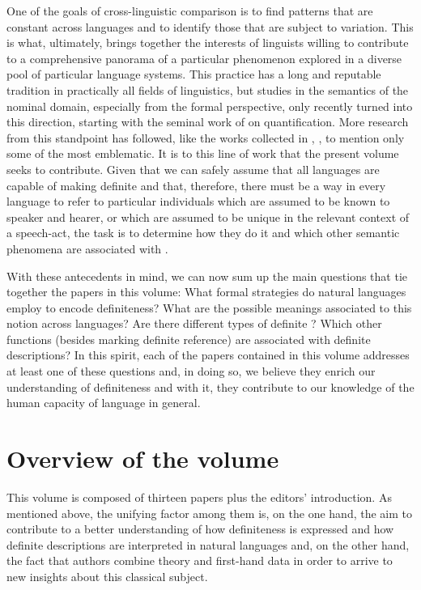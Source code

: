 \documentclass[output=paper]{langsci/langscibook}
\begin{document}
One of the goals of cross-linguistic comparison is to find patterns that are constant across languages and to identify those that are subject to variation. This is what, ultimately, brings together the interests of linguists willing to contribute to a comprehensive panorama of a particular phenomenon explored in a diverse pool of particular language systems. This practice has a long and reputable tradition in practically all fields of linguistics, but studies in the semantics of the nominal domain, especially from the formal perspective, only recently turned into this direction, starting with the seminal work of \citet{Bach1995} on quantification. More research from this standpoint has followed, like the works collected in \citet{Matthewson2008a}, \citet{Keenan2012}, to mention only some of the most emblematic. It is to this line of work that the present volume seeks to contribute. Given that we can safely assume that all languages are capable of making definite  and that, therefore, there must be a way in every language to refer to particular individuals which are assumed to be known to speaker and hearer, or which are assumed to be unique in the relevant context of a speech-act, the task is to determine how they do it and which other semantic phenomena are associated with . \newpage

With these antecedents in mind, we can now sum up the main questions that tie together the papers in this volume: What formal strategies do natural languages employ to encode definiteness? What are the possible meanings associated to this notion across languages? Are there different types of definite ? Which other functions (besides marking definite reference) are associated with definite descriptions? In this spirit, each of the papers contained in this volume addresses at least one of these questions and, in doing so, we believe they enrich our understanding of definiteness and with it, they contribute to our knowledge of the human capacity of language in general. 

\section{Overview of the volume}

This volume is composed of thirteen papers plus the editors’ introduction. As mentioned above, the unifying factor among them is, on the one hand, the aim to contribute to a better understanding of how definiteness is expressed and how definite descriptions are interpreted in natural languages and, on the other hand, the fact that authors combine theory and first-hand data in order to arrive to new insights about this classical subject. 
\end{document}
